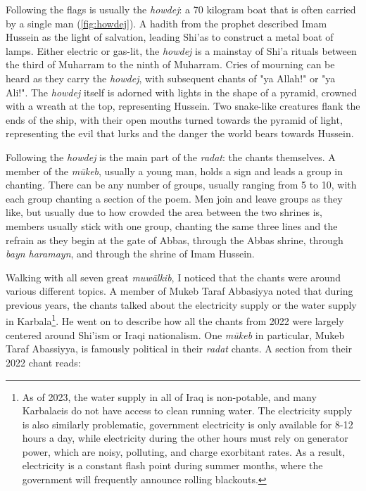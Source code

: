 Following the flags is usually the \emph{howdej}: a 70 kilogram boat that is often carried by a single man (\ref{fig:howdej}). A hadith from the prophet described Imam Hussein as the light of salvation, leading Shi'as to construct a metal boat of lamps. Either electric or gas-lit, the \emph{howdej} is a mainstay of Shi'a rituals between the third of Muharram to the ninth of Muharram. Cries of mourning can be heard as they carry the \emph{howdej}, with subsequent chants of "ya Allah!" or "ya Ali!". The \emph{howdej} itself is adorned with lights in the shape of a pyramid, crowned with a wreath at the top, representing Hussein. Two snake-like creatures flank the ends of the ship, with their open mouths turned towards the pyramid of light, representing the evil that lurks and the danger the world bears towards Hussein. 




Following the \emph{howdej} is the main part of the \emph{radat}: the chants themselves. A member of the \emph{mūkeb}, usually a young man, holds a sign and leads a group in chanting. There can be any number of groups, usually ranging from 5 to 10, with each group chanting a section of the poem. Men join and leave groups as they like, but usually due to how crowded the area between the two shrines is, members usually stick with one group, chanting the same three lines and the refrain as they begin at the gate of Abbas, through the Abbas shrine, through \emph{bayn haramayn}, and through the shrine of Imam Hussein. 

Walking with all seven great \emph{muwālkib}, I noticed that the chants were around various different topics. A member of Mukeb Taraf Abbasiyya noted that during previous years, the chants talked about the electricity supply or the water supply in Karbala\footnote{As of 2023, the water supply in all of Iraq is non-potable, and many Karbalaeis do not have access to clean running water. The electricity supply is also similarly problematic, government electricity is only available for 8-12 hours a day, while electricity during the other hours must rely on generator power, which are noisy, polluting, and charge exorbitant rates. As a result, electricity is a constant flash point during summer months, where the government will frequently announce rolling blackouts.}. He went on to describe how all the chants from 2022 were largely centered around Shi'ism or Iraqi nationalism. One \emph{mūkeb} in particular, Mukeb Taraf Abassiyya, is famously political in their \emph{radat} chants. A section from their 2022 chant reads: 


